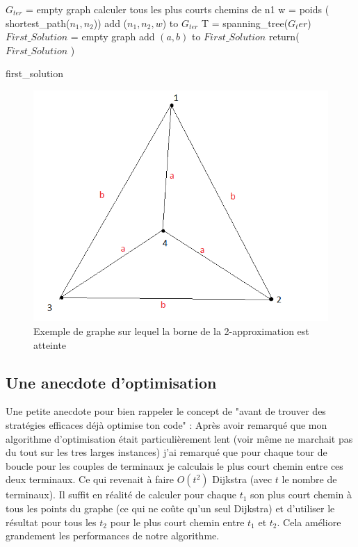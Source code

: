 \documentclass[10pt,a4paper]{article}
\begin{document}
\begin{algorithm}[H]
\SetAlgoLined
{}
$G_{ter}$ = empty graph\;
{
	calculer tous les plus courts chemins de n1\;
	{
		w = poids ( shortest\_path($n_1,n_2$))\;
		add  ($n_1,n_2,w $) to $G_{ter}$ \; 
	}
}
T = spanning\_tree($G_ter$)
$First\_Solution$ = empty graph\;
{
	{
		add $(a,b)$ to $First\_Solution$ \;
	}
}
return($First\_Solution$ )\;
\caption{first\_solution}
\end{algorithm}

\begin{figure}
\includegraphics[scale=.5]{images/exemple_borne}
\caption{Exemple de graphe sur lequel la borne de la 2-approximation est atteinte}
\label{exborne}
\end{figure}

\subsection{Une anecdote d'optimisation}
Une petite anecdote pour bien rappeler le concept de "avant de trouver des stratégies efficaces déjà optimise ton code" :
Après avoir remarqué que mon algorithme d'optimisation était particulièrement lent (voir même ne marchait pas du tout sur les tres larges instances) j'ai remarqué que pour chaque tour de boucle pour les couples de terminaux je calculais le plus court chemin entre ces deux terminaux. Ce qui revenait à faire $O(t^2)$ Dijkstra (avec $t$ le nombre de terminaux).  Il suffit en réalité de calculer pour chaque $t_1$ son plus court chemin à tous les points du graphe (ce qui ne coûte qu'un seul Dijkstra) et d'utiliser le résultat pour tous les $t_2$ pour le plus court chemin entre $t_1$ et $t_2$. Cela améliore grandement les performances de notre algorithme. 
\end{document}
